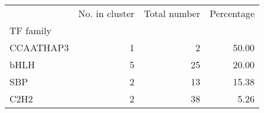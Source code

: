 \begin{tabular}{lrrr}
\toprule
{} &  No. in cluster &  Total number &  Percentage \\
TF family &                 &               &             \\
\midrule
CCAATHAP3 &               1 &             2 &       50.00 \\
bHLH      &               5 &            25 &       20.00 \\
SBP       &               2 &            13 &       15.38 \\
C2H2      &               2 &            38 &        5.26 \\
\bottomrule
\end{tabular}
